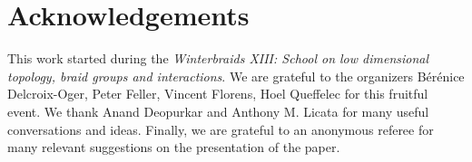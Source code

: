 \documentclass{amsart}
\theoremstyle{definition}
\begin{document}

\section*{Acknowledgements}

This work started during the \emph{Winterbraids XIII: School on low dimensional topology, braid groups and interactions}. We are grateful to the organizers Bérénice Delcroix-Oger, Peter Feller, Vincent Florens, Hoel Queffelec for this fruitful event.
We thank Anand Deopurkar and Anthony M. Licata for many useful conversations and ideas.
Finally, we are grateful to an anonymous referee for many relevant suggestions on the presentation of the paper.


{}


\label{sec:biblio}
\end{document}
